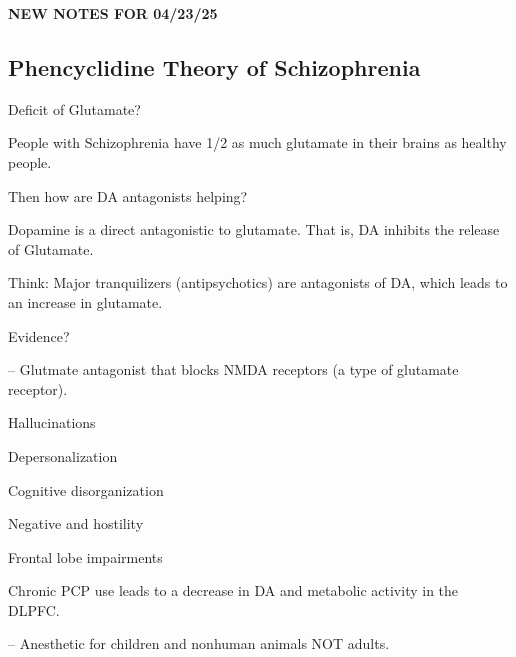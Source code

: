 \begin{center}
    \textbf{NEW NOTES FOR 04/23/25} \\
    \hrulefill
\end{center}

\subsection{Phencyclidine Theory of Schizophrenia}

\begin{coloredlist}
    \item Deficit of Glutamate?
    \begin{coloredlist}
        \item People with Schizophrenia have 1/2 as much glutamate in their brains as healthy people.
        \item Then how are DA antagonists helping?
        \begin{coloredlist}
            \item Dopamine is a direct antagonistic to glutamate. That is, DA inhibits the release of Glutamate.
            \item Think: Major tranquilizers (antipsychotics) are antagonists of DA, which leads to an increase in glutamate.
        \end{coloredlist}
    \end{coloredlist}
    \item Evidence?
    \begin{coloredlist}
        \item {} -- Glutmate antagonist that blocks NMDA receptors (a type of glutamate receptor).
        \begin{multicols}{2}
            \begin{coloredlist}
                \item Hallucinations
                \item Depersonalization
                \item Cognitive disorganization
                \item Negative and hostility
                \item Frontal lobe impairments
            \end{coloredlist}
        \end{multicols}
        \item Chronic PCP use leads to a decrease in DA and metabolic activity in the DLPFC.
        \item {} -- Anesthetic for children and nonhuman animals NOT adults.

\end{coloredlist}
\end{coloredlist}
